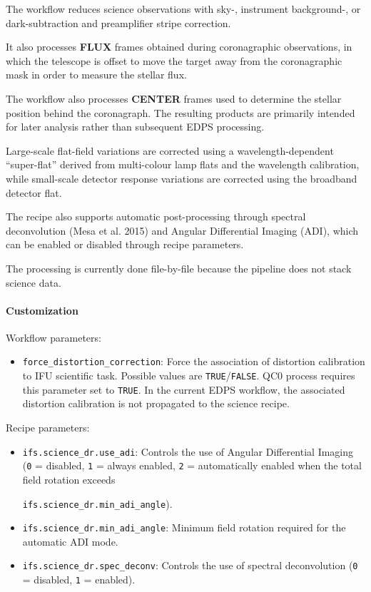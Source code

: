 The workflow reduces science observations with sky-, instrument background-, or dark-subtraction and preamplifier stripe correction.

It also processes \textbf{FLUX} frames obtained during coronagraphic
observations, in which the telescope is offset to move the target away
from the coronagraphic mask in order to measure the stellar flux.

The workflow also processes \textbf{CENTER} frames used to determine the stellar position behind the coronagraph. The resulting products are primarily intended for later analysis rather than subsequent EDPS processing.

Large-scale flat-field variations are corrected using a wavelength-dependent ``super-flat'' derived from multi-colour lamp flats and the wavelength calibration, while small-scale detector response variations are corrected using the broadband detector flat.

The recipe also supports automatic post-processing through spectral
deconvolution (Mesa et al. 2015) and Angular Differential Imaging (ADI),
which can be enabled or disabled through recipe parameters.

The processing is currently done file-by-file because the pipeline does not stack science data.

\paragraph{Customization}

Workflow parameters:

\begin{itemize}
\item \texttt{force\_distortion\_correction}: Force the association of distortion calibration to IFU scientific task. Possible values are \texttt{TRUE}/\texttt{FALSE}. QC0 process requires this parameter set to \texttt{TRUE}. In the current EDPS workflow, the associated distortion calibration is not propagated to the science recipe.
\end{itemize}

Recipe parameters:

\begin{itemize}

\item \texttt{ifs.science\_dr.use\_adi}:
Controls the use of Angular Differential Imaging
(\texttt{0} = disabled,
 \texttt{1} = always enabled,
 \texttt{2} = automatically enabled when the total field rotation exceeds
 
 \texttt{ifs.science\_dr.min\_adi\_angle}).

\item \texttt{ifs.science\_dr.min\_adi\_angle}:
Minimum field rotation required for the automatic ADI mode.

\item \texttt{ifs.science\_dr.spec\_deconv}:
Controls the use of spectral deconvolution
(\texttt{0} = disabled,
 \texttt{1} = enabled).
\end{itemize}

